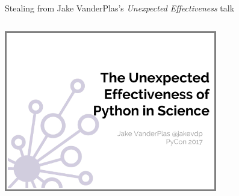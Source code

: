 \documentclass[aspectratio=169]{beamer}
\begin{document}
\begin{frame}{Stealing from Jake VanderPlas's {\it Unexpected Effectiveness} talk}
\begin{columns}[b]

\includegraphics[width=\linewidth]{unreasonable-effectiveness.png}
\vspace{5.3 cm}
\end{columns}
\end{frame}
\end{document}
